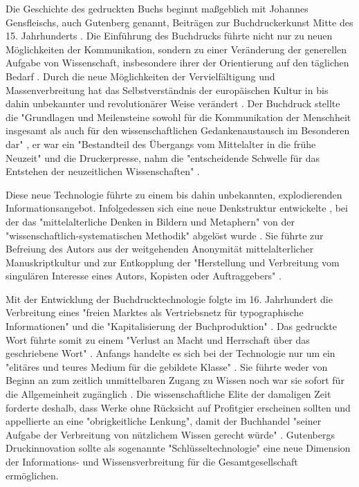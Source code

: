 Die Geschichte des gedruckten Buchs beginnt maßgeblich mit Johannes Gensfleischs, auch Gutenberg genannt, Beiträgen zur Buchdruckerkunst \cite{wittmann_1999_geschichte} Mitte des 15. Jahrhunderts \cite{suchen}. Die Einführung des Buchdrucks führte nicht nur zu neuen Möglichkeiten der Kommunikation, sondern zu einer Veränderung der generellen Aufgabe von Wissenschaft, insbesondere ihrer der Orientierung auf den täglichen Bedarf \cite{Luhmann1998}. Durch die neue Möglichkeiten der Vervielfältigung und Massenverbreitung hat das Selbstverständnis der europäischen Kultur in bis dahin unbekannter \cite{giesecke_1991_buchdruck} und revolutionärer Weise verändert \cite{wunderlich_2008_buchdruck}. Der Buchdruck stellte die "Grundlagen und Meilensteine sowohl für die Kommunikation der Menschheit insgesamt als auch für den wissenschaftlichen Gedankenaustausch im Besonderen dar" \cite{schirmbacher_2009_wisspub}, er war ein "Bestandteil des Übergangs vom Mittelalter in die frühe Neuzeit" \cite{lange2008medienwettbewerb} und die Druckerpresse, nahm die "entscheidende Schwelle für das Entstehen der neuzeitlichen Wissenschaften" \cite{luhmann_1997_gesellschaft}.

Diese neue Technologie führte zu einem bis dahin unbekannten, explodierenden Informationsangebot. Infolgedessen sich eine neue Denkstruktur entwickelte \cite{eisenstein_1997_druckerpresse}, bei der das "mittelalterliche Denken in Bildern und Metaphern" von der "wissenschaftlich-systematischen Methodik" abgelöst wurde \cite{wunderlich_2008_buchdruck}. Sie führte zur Befreiung des Autors aus der weitgehenden Anonymität mittelalterlicher Manuskriptkultur und zur Entkopplung der "Herstellung und Verbreitung vom singulären Interesse eines Autors, Kopisten oder Auftraggebers"\cite{wunderlich_2008_buchdruck} \cite{schirmbacher_2009_wisspub}.

Mit der Entwicklung der Buchdrucktechnologie folgte im 16. Jahrhundert die Verbreitung eines "freien Marktes als Vertriebsnetz für typographische Informationen"\cite{giesecke_1991_buchdruck} und die "Kapitalisierung der Buchproduktion" \cite{steiner_1998_autorenhonorar}. Das gedruckte Wort führte somit zu einem "Verlust an Macht und Herrschaft über das geschriebene Wort" \cite{wunderlich_2008_buchdruck}. Anfangs handelte es sich bei der Technologie nur um ein "elitäres und teures Medium für die gebildete Klasse" \cite{hartmann_2008_medien}. Sie führte weder von Beginn an zum zeitlich unmittelbaren Zugang zu Wissen noch war sie sofort für die Allgemeinheit zugänglich \cite{hartmann_2008_medien}. Die wissenschaftliche Elite der damaligen Zeit forderte deshalb, dass Werke ohne Rücksicht auf Profitgier erscheinen sollten und appellierte an eine "obrigkeitliche Lenkung", damit der Buchhandel "seiner Aufgabe der Verbreitung von nützlichem Wissen gerecht würde" \cite{wittmann_1999_geschichte}. Gutenbergs Druckinnovation sollte als sogenannte "Schlüsseltechnologie" \cite{jager_1993_theoretische} eine neue Dimension der Informations- und Wissensverbreitung für die Gesamtgesellschaft ermöglichen.


